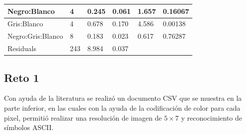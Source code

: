 \documentclass[12pt, letterpaper] {article}
\begin{document}
\begin{table}[H]
\begin{tabular}{|l|l|l|l|l|l|}
\rowcolor[HTML]{ECF4FF} 
Negro:Blanco                                                                   & 4                                                        & 0.245                                                        & 0.061                                                         & 1.657                                                         & 0.16067                                                                   \\ \hline
\rowcolor[HTML]{ECF4FF} 
Gris:Blanco                                                                    & 4                                                        & 0.678                                                        & 0.170                                                         & 4.586                                                         & 0.00138                                                                   \\ \hline
\rowcolor[HTML]{ECF4FF} 
Negro:Gris:Blanco                                                              & 8                                                        & 0.183                                                        & 0.023                                                         & 0.617                                                         & 0.76287                                                                   \\ \hline
\rowcolor[HTML]{ECF4FF} 
Residuals                                                                      & 243                                                      & 8.984                                                        & 0.037                                                         &                                                               &                                                                           \\ \hline
\end{tabular}
\end{table}


\subsection{Reto 1}

Con ayuda de la literatura \cite{PLP12} se realizó un documento CSV que se muestra en la parte inferior, en las cuales con la ayuda de la codificación de color para cada pixel, permitió realizar una resolución de imagen de $5\times7$ y reconocimiento de símbolos ASCII.
\end{document}
